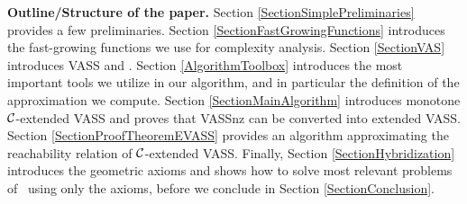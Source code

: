 \textbf{Outline/Structure of the paper.} Section \ref{SectionSimplePreliminaries} provides a few preliminaries. Section \ref{SectionFastGrowingFunctions} introduces the fast-growing functions we use for complexity analysis. Section \ref{SectionVAS} introduces VASS and \ConsideredModel. Section \ref{AlgorithmToolbox} introduces the most important tools we utilize in our algorithm, and in particular the definition of the approximation we compute. Section \ref{SectionMainAlgorithm} introduces monotone \(\mathcal{C}\)-extended VASS and proves that VASSnz can be converted into extended VASS. Section \ref{SectionProofTheoremEVASS} provides an algorithm approximating the reachability relation of \(\mathcal{C}\)-extended VASS. Finally, Section \ref{SectionHybridization} introduces the geometric axioms and shows how to solve most relevant problems of \ConsideredModel \ using only the axioms, before we conclude in Section \ref{SectionConclusion}.










